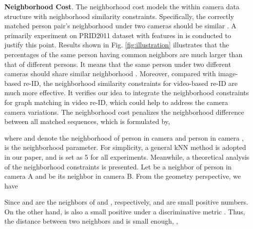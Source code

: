 \documentclass[10pt,twocolumn,letterpaper]{article}
\begin{document}
\textbf{Neighborhood Cost}. The neighborhood cost  models the within camera data structure with neighborhood similarity constraints. Specifically, the correctly matched person pair's neighborhood under two cameras should be similar \cite{mmm15,mm15rank}. A primarily experiment on PRID2011 dataset with features in \cite{iccv15des} is conducted to justify this point. Results shown in Fig. \ref{fig:illustration} illustrates that the percentages of the same person having common neighbors are much larger than that of different persons. It means that the same person under two different cameras should share similar neighborhood \cite{tmm16cross}. Moreover, compared with image-based re-ID, the neighborhood similarity constraints for video-based re-ID are much more effective. It verifies our idea to integrate the neighborhood constraints for graph matching in video re-ID, which could help to address the camera camera variations. The neighborhood cost  penalizes the neighborhood difference between all matched sequences, which is formulated by,

where  and  denote the neighborhood of person  in camera  and person  in camera ,  is the neighborhood parameter. For simplicity, a general kNN method is adopted in our paper, and  is set as 5 for all experiments. Meanwhile, a theoretical analysis of the neighborhood constraints is presented. Let  be a neighbor of person  in camera A and  be its neighbor in camera B. From the geometry perspective, we have

Since  and  are the neighbors of  and , respectively,  and  are small positive numbers. On the other hand,  is also a small positive under a discriminative metric . Thus, the distance between two neighbors  and  is small enough, \ie,
\end{document}
